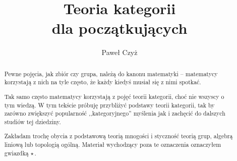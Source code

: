 \documentclass[12pt, notitlepage]{article}
\title{Teoria kategorii\\
\large dla początkujących}
\author{Paweł Czyż}
\theoremstyle{definition}
\newcommand{\starred}{$\star$\,}
\begin{document}
  \maketitle
  \begin{abstract}
    Pewne pojęcia, jak zbiór czy grupa, należą do kanonu matematyki -- matematycy korzystają z nich na tyle często, że każdy kiedyś musiał się z nimi spotkać.

    Tak samo często matematycy korzystają z pojęć teorii kategorii, choć nie wszyscy o tym wiedzą. W tym tekście próbuję przybliżyć podstawy teorii kategorii, tak by zarówno zwiększyć popularność ,,kategoryjnego'' myślenia jak i zachęcić do dalszych studiów tej dziedziny.

    Zakładam trochę obycia z podstawową teorią mnogości i styczność teorią grup, algebrą liniową lub topologią ogólną. Materiał wychodzący poza te oznaczenia oznaczyłem gwiazdką \starred.
  \end{abstract}

 
 
 
 
 
 

% 
\end{document}
